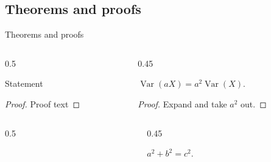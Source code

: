 \subsection{Theorems and proofs}
\begin{frame}{Theorems and proofs}
\begin{columns}[T,onlytextwidth]
\begin{column}{0.5\textwidth}
\begin{codeonly}
\begin{lemma}
  Statement
  \begin{proof}
    Proof text
  \end{proof}
\end{lemma}
\end{codeonly}
\end{column}
\begin{column}{0.45\textwidth}
\stepoffset
\begin{lemma}
    $\operatorname{Var}(aX)=a^{2}\operatorname{Var}(X)$.
    \begin{proof}
        Expand and take $a^{2}$ out.
    \end{proof}
\end{lemma}
\end{column}
\end{columns}
\bigskip
\begin{columns}[T,onlytextwidth]
\begin{column}{0.5\textwidth}
\begin{codeonly}
\end{column}
\end{columns}
\end{frame}

